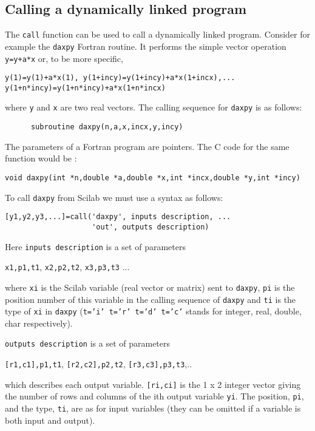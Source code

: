 \subsection{Calling a dynamically linked program}

The {\tt call} function can be used to call a dynamically linked
program. Consider for example the {\tt daxpy} Fortran routine. It performs 
the simple vector operation {\tt y=y+a*x} or, to be more specific, 
\begin{verbatim}
y(1)=y(1)+a*x(1), y(1+incy)=y(1+incy)+a*x(1+incx),...
y(1+n*incy)=y(1+n*incy)+a*x(1+n*incx)
\end{verbatim} 
where {\tt y} and {\tt x} are two real vectors.
The calling sequence for {\tt daxpy} is as follows:
\begin{verbatim}
      subroutine daxpy(n,a,x,incx,y,incy)
\end{verbatim}
The parameters of a Fortran program are pointers. The C code for the 
same function would be :
\begin{verbatim}
void daxpy(int *n,double *a,double *x,int *incx,double *y,int *incy)
\end{verbatim}
To call {\tt daxpy} from Scilab we must use a syntax as follows: 
\begin{verbatim}
[y1,y2,y3,...]=call('daxpy', inputs description, ...
                    'out', outputs description)
\end{verbatim}
\noindent
Here {\tt inputs description} is a set of parameters
 
{\tt x1,p1,t1}, {\tt x2,p2,t2}, {\tt x3,p3,t3} ... 

\noindent
where {\tt xi} is the Scilab variable (real vector or matrix) sent to 
{\tt daxpy},
{\tt pi} is the position number of this variable in the calling
sequence of {\tt daxpy} and {\tt ti} is the type of {\tt xi} in {\tt daxpy}
({\tt t='i'  t='r'  t='d' t='c'} stands for integer, real,  double, char
 respectively).

\noindent
{\tt outputs description} is a set of parameters
 
{\tt [r1,c1],p1,t1}, {\tt [r2,c2],p2,t2}, {\tt [r3,c3],p3,t3},..

\noindent
which describes each output variable. {\tt [ri,ci]} is the
1 x 2 integer vector giving the number of rows and columns of the
ith output variable {\tt yi}. The position, {\tt pi}, and the type, {\tt ti},
are as for input variables (they can be omitted if a variable is both input and
output). 

